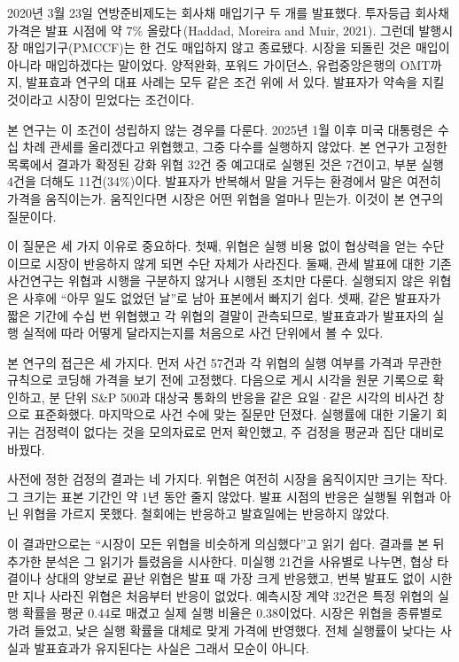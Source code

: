 \documentclass[11pt,a4paper]{article}
\begin{document}
2020년 3월 23일 연방준비제도는 회사채 매입기구 두 개를 발표했다. 투자등급 회사채 가격은 발표 시점에 약 7\% 올랐다\,(Haddad, Moreira and Muir, 2021). 그런데 발행시장 매입기구(PMCCF)는 한 건도 매입하지 않고 종료됐다. 시장을 되돌린 것은 매입이 아니라 매입하겠다는 말이었다. 양적완화, 포워드 가이던스, 유럽중앙은행의 OMT까지, 발표효과 연구의 대표 사례는 모두 같은 조건 위에 서 있다. 발표자가 약속을 지킬 것이라고 시장이 믿었다는 조건이다.

본 연구는 이 조건이 성립하지 않는 경우를 다룬다. 2025년 1월 이후 미국 대통령은 수십 차례 관세를 올리겠다고 위협했고, 그중 다수를 실행하지 않았다. 본 연구가 고정한 목록에서 결과가 확정된 강화 위협 32건 중 예고대로 실행된 것은 7건이고, 부분 실행 4건을 더해도 11건(34\%)이다. 발표자가 반복해서 말을 거두는 환경에서 말은 여전히 가격을 움직이는가. 움직인다면 시장은 어떤 위협을 얼마나 믿는가. 이것이 본 연구의 질문이다.

이 질문은 세 가지 이유로 중요하다. 첫째, 위협은 실행 비용 없이 협상력을 얻는 수단이므로 시장이 반응하지 않게 되면 수단 자체가 사라진다. 둘째, 관세 발표에 대한 기존 사건연구는 위협과 시행을 구분하지 않거나 시행된 조치만 다룬다. 실행되지 않은 위협은 사후에 ``아무 일도 없었던 날''로 남아 표본에서 빠지기 쉽다. 셋째, 같은 발표자가 짧은 기간에 수십 번 위협했고 각 위협의 결말이 관측되므로, 발표효과가 발표자의 실행 실적에 따라 어떻게 달라지는지를 처음으로 사건 단위에서 볼 수 있다.

본 연구의 접근은 세 가지다. 먼저 사건 57건과 각 위협의 실행 여부를 가격과 무관한 규칙으로 코딩해 가격을 보기 전에 고정했다. 다음으로 게시 시각을 원문 기록으로 확인하고, 분 단위 S\&P 500과 대상국 통화의 반응을 같은 요일·같은 시각의 비사건 창으로 표준화했다. 마지막으로 사건 수에 맞는 질문만 던졌다. 실행률에 대한 기울기 회귀는 검정력이 없다는 것을 모의자료로 먼저 확인했고, 주 검정을 평균과 집단 대비로 바꿨다.

사전에 정한 검정의 결과는 네 가지다. 위협은 여전히 시장을 움직이지만 크기는 작다. 그 크기는 표본 기간인 약 1년 동안 줄지 않았다. 발표 시점의 반응은 실행될 위협과 아닌 위협을 가르지 못했다. 철회에는 반응하고 발효일에는 반응하지 않았다.

이 결과만으로는 ``시장이 모든 위협을 비슷하게 의심했다''고 읽기 쉽다. 결과를 본 뒤 추가한 분석은 그 읽기가 틀렸음을 시사한다. 미실행 21건을 사유별로 나누면, 협상 타결이나 상대의 양보로 끝난 위협은 발표 때 가장 크게 반응했고, 번복 발표도 없이 시한만 지나 사라진 위협은 처음부터 반응이 없었다. 예측시장 계약 32건은 특정 위협의 실행 확률을 평균 0.44로 매겼고 실제 실행 비율은 0.38이었다. 시장은 위협을 종류별로 가려 들었고, 낮은 실행 확률을 대체로 맞게 가격에 반영했다. 전체 실행률이 낮다는 사실과 발표효과가 유지된다는 사실은 그래서 모순이 아니다.
\end{document}
